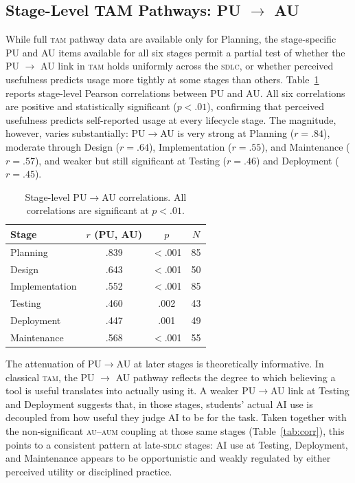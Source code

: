 \documentclass[sigconf,anonymous]{acmart}
\newcommand{\AUM}{\textsc{aum}\xspace}
\newcommand{\AU}{\textsc{au}\xspace}
\newcommand{\TAM}{\textsc{tam}\xspace}
\newcommand{\SDLC}{\textsc{sdlc}\xspace}
\begin{document}
\subsection{Stage-Level TAM Pathways: PU $\rightarrow$ AU}
While full \TAM pathway data are available only for Planning, the
stage-specific PU and AU items available for all six stages permit a
partial test of whether the PU $\rightarrow$ AU link in \TAM holds
uniformly across the \SDLC, or whether perceived usefulness predicts
usage more tightly at some stages than others. Table~\ref{tab:puau}
reports stage-level Pearson correlations between PU and AU. All six
correlations are positive and statistically significant
($p < .01$), confirming that perceived usefulness predicts self-reported
usage at every lifecycle stage. The magnitude, however, varies
substantially: PU$\rightarrow$AU is very strong at Planning
($r = .84$), moderate through Design ($r = .64$), Implementation
($r = .55$), and Maintenance ($r = .57$), and weaker but still
significant at Testing ($r = .46$) and Deployment ($r = .45$).

\begin{table}[h]
\small
\caption{Stage-level PU$\rightarrow$AU correlations. All
  correlations are significant at $p < .01$.}
\label{tab:puau}
\begin{tabular}{lccc}
\toprule
\textbf{Stage} & $r$ (PU, AU) & $p$ & $N$ \\
\midrule
Planning       & .839 & $<$.001 & 85 \\
Design         & .643 & $<$.001 & 50 \\
Implementation & .552 & $<$.001 & 85 \\
Testing        & .460 & .002    & 43 \\
Deployment     & .447 & .001    & 49 \\
Maintenance    & .568 & $<$.001 & 55 \\
\bottomrule
\end{tabular}
\end{table}

The attenuation of PU$\rightarrow$AU at later stages is theoretically
informative. In classical \TAM, the PU $\rightarrow$ AU pathway reflects
the degree to which believing a tool is useful translates into actually
using it. A weaker PU$\rightarrow$AU link at Testing and Deployment
suggests that, in those stages, students' actual AI use is decoupled
from how useful they judge AI to be for the task. Taken together with
the non-significant \AU--\AUM coupling at those same stages
(Table~\ref{tab:corr}), this points to a consistent pattern at
late-\SDLC stages: AI use at Testing, Deployment, and Maintenance
appears to be opportunistic and weakly regulated by either perceived
utility or disciplined practice.
\end{document}
